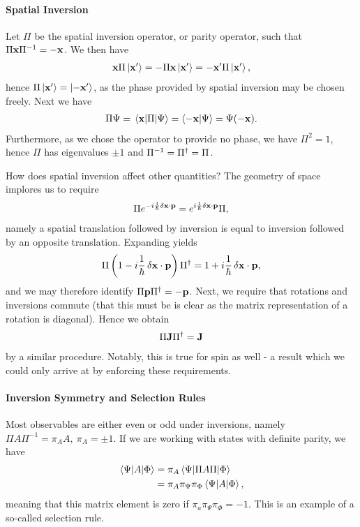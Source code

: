 \paragraph{Spatial Inversion}
Let $\Pi$ be the spatial inversion operator, or parity operator, such that $\Pi\vb{x}\Pi^{-1} = -\vb{x}$. We then have
\begin{align*}
	\vb{x}\Pi\ket{\vb{x}^{\prime}} = -\Pi\vb{x}\ket{\vb{x}^{\prime}} = -\vb{x}^{\prime}\Pi\ket{\vb{x}^{\prime}},
\end{align*}
hence $\Pi\ket{\vb{x}^{\prime}} = \ket{-\vb{x}^{\prime}}$, as the phase provided by spatial inversion may be chosen freely. Next we have
\begin{align*}
	\Pi\Psi = \mel{\vb{x}}{\Pi}{\Psi} = \braket{-\vb{x}}{\Psi} = \Psi(-\vb{x}).
\end{align*}
Furthermore, as we chose the operator to provide no phase, we have $\Pi^{2} = 1$, hence $\Pi$ has eigenvalues $\pm 1$ and $\Pi^{-1} = \Pi^{\dagger} = \Pi$.

How does spatial inversion affect other quantities? The geometry of space implores us to require
\begin{align*}
	\Pi e^{-i\frac{1}{\hbar}\var{\vb{x}}\cdot\vb{p}} = e^{i\frac{1}{\hbar}\var{\vb{x}}\cdot\vb{p}}\Pi,
\end{align*}
namely a spatial translation followed by inversion is equal to inversion followed by an opposite translation. Expanding yields
\begin{align*}
	\Pi\left(1 -i\frac{1}{\hbar}\var{\vb{x}}\cdot\vb{p}\right)\Pi^{\dagger} = 1 + i\frac{1}{\hbar}\var{\vb{x}}\cdot\vb{p},
\end{align*}
and we may therefore identify $\Pi\vb{p}\Pi^{\dagger} = -\vb{p}$. Next, we require that rotations and inversions commute (that this must be is clear as the matrix representation of a rotation is diagonal). Hence we obtain
\begin{align*}
	\Pi\vb{J}\Pi^{\dagger} = \vb{J}
\end{align*}
by a similar procedure. Notably, this is true for spin as well - a result which we could only arrive at by enforcing these requirements.

\paragraph{Inversion Symmetry and Selection Rules}
Most observables are either even or odd under inversions, namely $\Pi A\Pi^{-1} = \pi_{A}A,\ \pi_{A} = \pm 1$. If we are working with states with definite parity, we have
\begin{align*}
	\mel{\Psi}{A}{\Phi} &= \pi_{A}\mel{\Psi}{\Pi A\Pi}{\Phi} \\
	                    &= \pi_{A}\pi_{\Psi}\pi_{\Phi}\mel{\Psi}{A}{\Phi},
\end{align*}
meaning that this matrix element is zero if $\pi_{a}\pi_{\Psi}\pi_{\Phi} = -1$. This is an example of a so-called selection rule.

